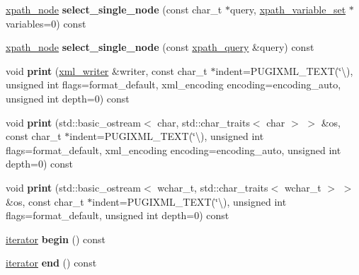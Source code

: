 \begin{DoxyCompactItemize}
\hyperlink{classpugi_1_1xpath__node}{xpath\+\_\+node} {\bfseries select\+\_\+single\+\_\+node} (const char\+\_\+t $\ast$query, \hyperlink{classpugi_1_1xpath__variable__set}{xpath\+\_\+variable\+\_\+set} $\ast$variables=0) const
\item 
\mbox{\label{classpugi_1_1xml__node_aac0de03377bfdf2aede9ae36dbfd9bc5}} 
\hyperlink{classpugi_1_1xpath__node}{xpath\+\_\+node} {\bfseries select\+\_\+single\+\_\+node} (const \hyperlink{classpugi_1_1xpath__query}{xpath\+\_\+query} \&query) const
\item 
\mbox{\label{classpugi_1_1xml__node_a91631dad3ef016247d0a948b8a93dfa0}} 
void {\bfseries print} (\hyperlink{classpugi_1_1xml__writer}{xml\+\_\+writer} \&writer, const char\+\_\+t $\ast$indent=P\+U\+G\+I\+X\+M\+L\+\_\+\+T\+E\+XT(\char`\"{}\textbackslash{}), unsigned int flags=format\+\_\+default, xml\+\_\+encoding encoding=encoding\+\_\+auto, unsigned int depth=0) const
\item 
\mbox{\label{classpugi_1_1xml__node_a1eae878020f1f73800dc41ced1206b9b}} 
void {\bfseries print} (std\+::basic\+\_\+ostream$<$ char, std\+::char\+\_\+traits$<$ char $>$ $>$ \&os, const char\+\_\+t $\ast$indent=P\+U\+G\+I\+X\+M\+L\+\_\+\+T\+E\+XT(\char`\"{}\textbackslash{}), unsigned int flags=format\+\_\+default, xml\+\_\+encoding encoding=encoding\+\_\+auto, unsigned int depth=0) const
\item 
\mbox{\label{classpugi_1_1xml__node_a9a7f1bef67aff094f0a7c3f5e15a4dbf}} 
void {\bfseries print} (std\+::basic\+\_\+ostream$<$ wchar\+\_\+t, std\+::char\+\_\+traits$<$ wchar\+\_\+t $>$ $>$ \&os, const char\+\_\+t $\ast$indent=P\+U\+G\+I\+X\+M\+L\+\_\+\+T\+E\+XT(\char`\"{}\textbackslash{}), unsigned int flags=format\+\_\+default, unsigned int depth=0) const
\item 
\mbox{\label{classpugi_1_1xml__node_ae42dc1a560ee36a16f907cd7aa89cc9c}} 
\hyperlink{classpugi_1_1xml__node__iterator}{iterator} {\bfseries begin} () const
\item 
\mbox{\label{classpugi_1_1xml__node_a6c1f42812de4e25ac72908efab842126}} 
\hyperlink{classpugi_1_1xml__node__iterator}{iterator} {\bfseries end} () const

\end{DoxyCompactItemize}
